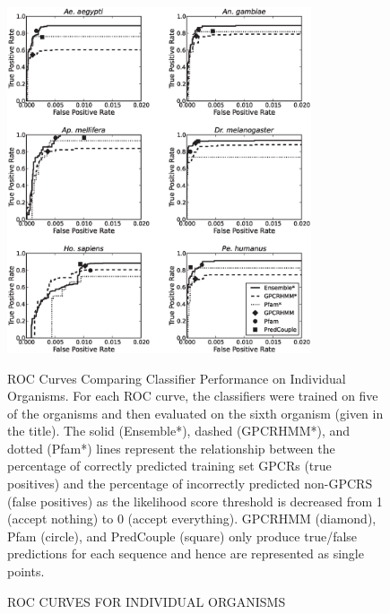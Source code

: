 \begin{figure}[H]
  \centering
  \caption{ROC CURVES FOR INDIVIDUAL ORGANISMS}
\includegraphics[width=0.8\textwidth]{figures/gpcr_classifier/organism_ensembl_roc.eps}

ROC Curves Comparing Classifier Performance on Individual Organisms.  For each ROC curve, the classifiers were trained on five of the organisms and then evaluated on the sixth organism (given in the title).  The solid (Ensemble*), dashed (GPCRHMM*), and dotted (Pfam*) lines represent the relationship between the percentage of correctly predicted training set GPCRs (true positives) and the percentage of incorrectly predicted non-GPCRS (false positives) as the likelihood score threshold is decreased from 1 (accept nothing) to 0 (accept everything).  GPCRHMM (diamond), Pfam (circle), and PredCouple (square) only produce true/false predictions for each sequence and hence are represented as single points.
\label{fig:individual-roc-curves}
\end{figure}

